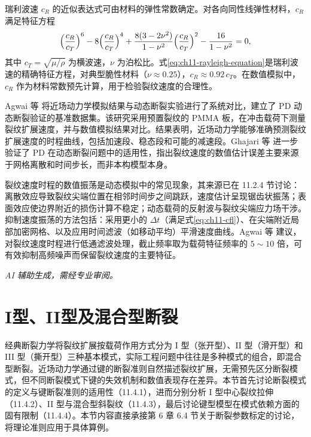 瑞利波速 $c_R$ 的近似表达式可由材料的弹性常数确定。对各向同性线弹性材料，$c_R$ 满足特征方程
\begin{equation}
\Bigl(\frac{c_R}{c_T}\Bigr)^{6}-8\Bigl(\frac{c_R}{c_T}\Bigr)^{4}+\frac{8(3-2\nu^{2})}{1-\nu^{2}}\Bigl(\frac{c_R}{c_T}\Bigr)^{2}-\frac{16}{1-\nu^{2}}=0,
\label{eq:ch11-rayleigh-equation}
\end{equation}
其中 $c_T=\sqrt{\mu/\rho}$ 为横波速，$\nu$ 为泊松比。式\eqref{eq:ch11-rayleigh-equation}是瑞利波速的精确特征方程，对典型脆性材料（$\nu\approx 0.25$），$c_R\approx 0.92\,c_T$。在数值模拟中，$c_R$ 作为材料常数预先计算，用于检验裂纹速度的合理性。

Agwai 等 \cite{Agwai2011} 将近场动力学模拟结果与动态断裂实验进行了系统对比，建立了 PD 动态断裂验证的基准数据集。该研究采用预置裂纹的 PMMA 板，在冲击载荷下测量裂纹扩展速度，并与数值模拟结果对比。结果表明，近场动力学能够准确预测裂纹扩展速度的时程曲线，包括加速段、稳态段和可能的减速段。Ghajari 等 \cite{Ghajari2014} 进一步验证了 PD 在动态断裂问题中的适用性，指出裂纹速度的数值估计误差主要来源于网格离散和时间步长，而非本构模型本身。

裂纹速度时程的数值振荡是动态模拟中的常见现象，其来源已在 11.2.4 节讨论：离散效应导致裂纹尖端位置在相邻时间步之间跳跃，速度估计呈现锯齿状振荡；表面效应使边界附近的损伤计算不稳定；动态载荷的反射波与裂纹尖端应力场干涉。抑制速度振荡的方法包括：采用更小的 $\Delta t$（满足式\eqref{eq:ch11-cfl}）、在尖端附近局部加密网格、以及应用时间滤波（如移动平均）平滑速度曲线。Agwai 等 \cite{Agwai2011} 建议，对裂纹速度时程进行低通滤波处理，截止频率取为载荷特征频率的 $5\sim 10$ 倍，可有效抑制高频噪声而保留裂纹速度的主要特征。

\emph{AI 辅助生成，需经专业审阅。}

\section{I型、II型及混合型断裂}\label{sec:ch11-mixed-mode}

经典断裂力学将裂纹扩展按载荷作用方式分为 I 型（张开型）、II 型（滑开型）和 III 型（撕开型）三种基本模式，实际工程问题中往往是多种模式的组合，即混合型断裂。近场动力学通过键的断裂准则自然描述裂纹扩展，无需预先区分断裂模式，但不同断裂模式下键的失效机制和数值表现存在差异。本节首先讨论断裂模式的定义与键断裂准则的适用性（11.4.1），进而分别分析 I 型中心裂纹拉伸（11.4.2）、II 型与混合型斜裂纹（11.4.3），最后讨论键型模型在模式依赖方面的固有限制（11.4.4）。本节内容直接承接第 6 章 6.4 节关于断裂参数标定的讨论，将理论准则应用于具体算例。

